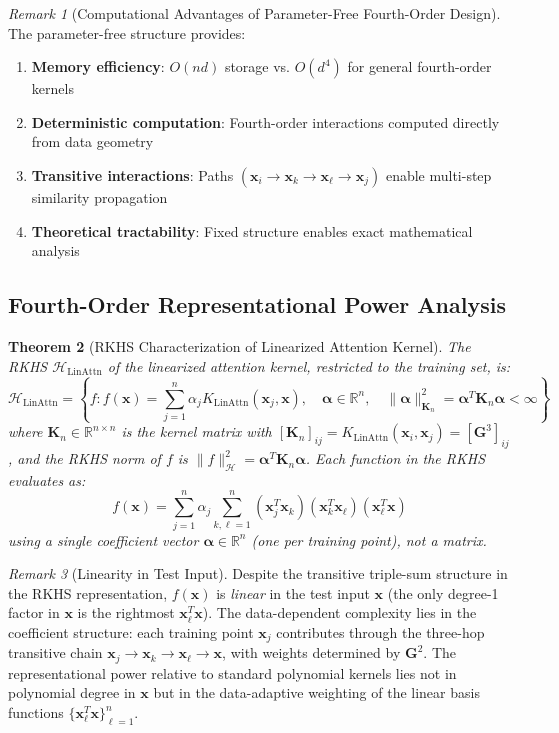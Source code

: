 \documentclass{article}
\theoremstyle{plain}
\newtheorem{theorem}{Theorem}[section]
\theoremstyle{definition}
\theoremstyle{remark}
\newtheorem{remark}[theorem]{Remark}
\newcommand{\R}{\mathbb{R}}
\begin{document}
\begin{remark}[Computational Advantages of Parameter-Free Fourth-Order Design]
The parameter-free structure provides:
\begin{enumerate}
\item \textbf{Memory efficiency}: $O(nd)$ storage vs. $O(d^4)$ for general fourth-order kernels
\item \textbf{Deterministic computation}: Fourth-order interactions computed directly from data geometry
\item \textbf{Transitive interactions}: Paths $(\mathbf{x}_i \to \mathbf{x}_k \to \mathbf{x}_\ell \to \mathbf{x}_j)$ enable multi-step similarity propagation
\item \textbf{Theoretical tractability}: Fixed structure enables exact mathematical analysis
\end{enumerate}
\end{remark}

\subsection{Fourth-Order Representational Power Analysis}

\begin{theorem}[RKHS Characterization of Linearized Attention Kernel]
\label{thm:rkhs_characterization}
The RKHS $\mathcal{H}_{\mathrm{LinAttn}}$ of the linearized attention kernel, restricted to the training set, is:
$$\mathcal{H}_{\mathrm{LinAttn}} = \left\{f : f(\mathbf{x}) = \sum_{j=1}^n \alpha_j K_{\mathrm{LinAttn}}(\mathbf{x}_j, \mathbf{x}),\quad \boldsymbol{\alpha} \in \R^n,\quad \|\boldsymbol{\alpha}\|_{\mathbf{K}_n}^2 = \boldsymbol{\alpha}^T\mathbf{K}_n\boldsymbol{\alpha} < \infty \right\}$$
where $\mathbf{K}_n \in \R^{n\times n}$ is the kernel matrix with $[\mathbf{K}_n]_{ij} = K_{\mathrm{LinAttn}}(\mathbf{x}_i, \mathbf{x}_j) = [\mathbf{G}^3]_{ij}$, and the RKHS norm of $f$ is $\|f\|_{\mathcal{H}}^2 = \boldsymbol{\alpha}^T \mathbf{K}_n \boldsymbol{\alpha}$. Each function in the RKHS evaluates as:
$$f(\mathbf{x}) = \sum_{j=1}^n \alpha_j \sum_{k,\ell=1}^n (\mathbf{x}_j^T\mathbf{x}_k)(\mathbf{x}_k^T\mathbf{x}_\ell)(\mathbf{x}_\ell^T\mathbf{x})$$
using a single coefficient vector $\boldsymbol{\alpha} \in \R^n$ (one per training point), not a matrix.
\end{theorem}

\begin{remark}[Linearity in Test Input]
Despite the transitive triple-sum structure in the RKHS representation, $f(\mathbf{x})$ is \emph{linear} in the test input $\mathbf{x}$ (the only degree-1 factor in $\mathbf{x}$ is the rightmost $\mathbf{x}_\ell^T\mathbf{x}$). The data-dependent complexity lies in the coefficient structure: each training point $\mathbf{x}_j$ contributes through the three-hop transitive chain $\mathbf{x}_j \to \mathbf{x}_k \to \mathbf{x}_\ell \to \mathbf{x}$, with weights determined by $\mathbf{G}^2$. The representational power relative to standard polynomial kernels lies not in polynomial degree in $\mathbf{x}$ but in the data-adaptive weighting of the linear basis functions $\{\mathbf{x}_\ell^T\mathbf{x}\}_{\ell=1}^n$.
\end{remark}
\end{document}
